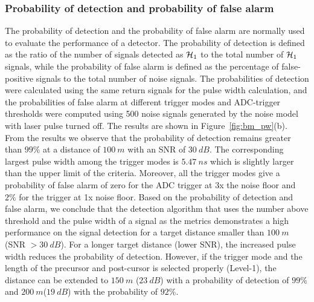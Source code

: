 \subsubsection{Probability of detection and  probability of false alarm}
The probability of detection and the probability of false alarm are normally used to evaluate the performance of a detector. The probability of detection is defined as the ratio of the number of signals detected as $\operatorname*{\mathcal{H}_1}$ to the total number of $\operatorname*{\mathcal{H}_1}$ signals, while the probability of false alarm is defined as the percentage of false-positive signals to the total number of noise signals. The probabilities of detection were calculated using the same return signals for the pulse width calculation, and the probabilities of false alarm at different trigger modes and ADC-trigger thresholds were computed using 500 noise signals generated by the noise model with laser pulse turned off. The results are shown in Figure~\ref{fig:bm_pw}(b). From the results we observe that the probability of detection remains greater than $99\%$ at a distance of $100~m$ with an SNR of $30~dB$. The corresponding largest pulse width among the trigger modes is $5.47~ns$ which 
is slightly larger than the upper limit of the criteria. Moreover, all the trigger modes give a probability of false alarm of zero for the ADC trigger at 3x the noise floor and $2\%$ for the trigger at 1x noise floor. Based on the probability of detection and false alarm, we conclude that the detection algorithm that uses the number above threshold and the pulse width of a signal as the metrics demonstrates a high performance on the signal detection for a target distance smaller than $100~m$ (SNR $>30~dB$). For a longer target distance (lower SNR), the increased pulse width reduces the probability of detection. However, if the trigger mode and the length of the precursor and post-cursor is selected properly (\eg Level-1), the distance can be extended to $150~m$ ($23~dB$) with a probability of detection of $99\%$ and $200~m$($19~dB$) with the probability of $92\%$.

